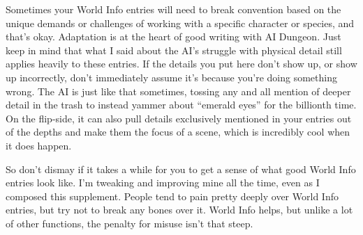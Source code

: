 \documentclass[Source-main.tex]{subfiles}
\begin{document}
Sometimes your World Info entries will need to break convention based on the unique demands or challenges of working with a specific character or species, and that’s okay.
Adaptation is at the heart of good writing with AI Dungeon.
Just keep in mind that what I said about the AI’s struggle with physical detail still applies heavily to these entries.
If the details you put here don’t show up, or show up incorrectly, don’t immediately assume it’s because you’re doing something wrong.
The AI is just like that sometimes, tossing any and all mention of deeper detail in the trash to instead yammer about “emerald eyes” for the billionth time.
On the flip-side, it can also pull details exclusively mentioned in your entries out of the depths and make them the focus of a scene, which is incredibly cool when it does happen.

So don’t dismay if it takes a while for you to get a sense of what good World Info entries look like.
I’m tweaking and improving mine all the time, even as I composed this supplement.
People tend to pain pretty deeply over World Info entries, but try not to break any bones over it.
World Info helps, but unlike a lot of other functions, the penalty for misuse isn’t that steep.
\end{document}
